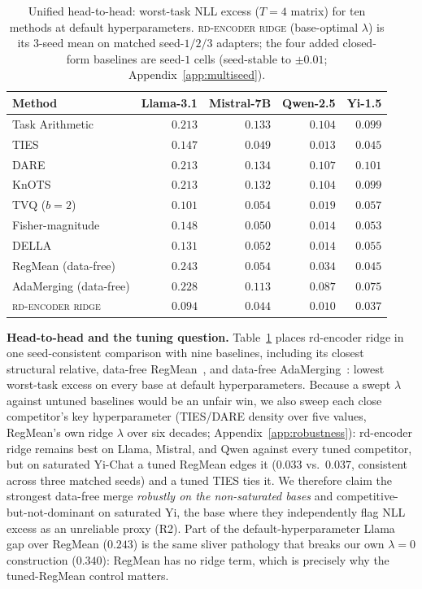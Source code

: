 \begin{table}[t]
\centering
\caption{Unified head-to-head: worst-task NLL excess ($T = 4$ matrix)
for ten methods at default hyperparameters. \textsc{rd-encoder ridge}
(base-optimal $\lambda$) is its $3$-seed mean on matched seed-$1/2/3$
adapters; the four added closed-form baselines are seed-$1$ cells
(seed-stable to $\pm 0.01$; Appendix~\ref{app:multiseed}).}
\label{tab:e10-baselines}
\small
\begin{tabular}{lrrrr}
\hline
Method & Llama-3.1 & Mistral-7B & Qwen-2.5 & Yi-1.5 \\
\hline
Task Arithmetic           & $0.213$ & $0.133$ & $0.104$ & $0.099$ \\
TIES                      & $0.147$ & $0.049$ & $0.013$ & $0.045$ \\
DARE                      & $0.213$ & $0.134$ & $0.107$ & $0.101$ \\
KnOTS                     & $0.213$ & $0.132$ & $0.104$ & $0.099$ \\
TVQ ($b{=}2$)             & $0.101$ & $0.054$ & $0.019$ & $0.057$ \\
Fisher-magnitude          & $0.148$ & $0.050$ & $0.014$ & $0.053$ \\
DELLA                     & $0.131$ & $0.052$ & $0.014$ & $0.055$ \\
RegMean (data-free)       & $0.243$ & $0.054$ & $0.034$ & $0.045$ \\
AdaMerging (data-free)    & $0.228$ & $0.113$ & $0.087$ & $0.075$ \\
\textsc{rd-encoder ridge} & $\mathbf{0.094}$ & $\mathbf{0.044}$ & $\mathbf{0.010}$ & $\mathbf{0.037}$ \\
\hline
\end{tabular}
\end{table}

\textbf{Head-to-head and the tuning question.}
Table~\ref{tab:e10-baselines} places rd-encoder ridge in one
seed-consistent comparison with nine baselines, including its closest
structural relative, data-free RegMean~\citep{jin2023regmean}, and
data-free AdaMerging~\citep{adamerging2024}: lowest worst-task excess
on every base at default hyperparameters. Because a swept $\lambda$
against untuned baselines would be an unfair win, we also sweep each
close competitor's key hyperparameter (TIES/DARE density over five
values, RegMean's own ridge $\lambda$ over six decades;
Appendix~\ref{app:robustness}): rd-encoder ridge remains best on
Llama, Mistral, and Qwen against every tuned competitor, but on
saturated Yi-Chat a tuned RegMean edges it ($0.033$ vs.\ $0.037$,
consistent across three matched seeds) and a tuned TIES ties it. We
therefore claim the strongest data-free merge \emph{robustly on the
non-saturated bases} and competitive-but-not-dominant on saturated
Yi, the base where they independently flag NLL excess as an unreliable
proxy (R2). Part of the default-hyperparameter
Llama gap over RegMean ($0.243$) is the same sliver pathology that
breaks our own $\lambda = 0$ construction ($0.340$): RegMean has no
ridge term, which is precisely why the tuned-RegMean control matters.

